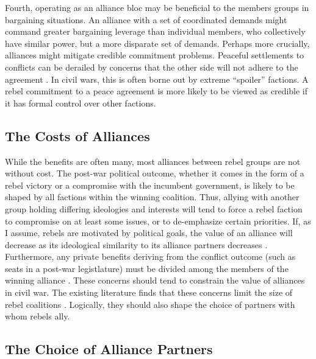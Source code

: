 \documentclass[12pt,]{book}
\begin{document}
Fourth, operating as an alliance bloc may be beneficial to the members
groups in bargaining situations. An alliance with a set of coordinated
demands might command greater bargaining leverage than individual
members, who collectively have similar power, but a more disparate set
of demands. Perhaps more crucially, alliances might mitigate credible
commitment problems. Peaceful settlements to conflicts can be derailed
by concerns that the other side will not adhere to the agreement
\citep{fearon95}. In civil wars, this is often borne out by extreme
``spoiler'' factions. A rebel commitment to a peace agreement is more
likely to be viewed as credible if it has formal control over other
factions.

\subsection{The Costs of Alliances}\label{the-costs-of-alliances}

While the benefits are often many, most alliances between rebel groups
are not without cost. The post-war political outcome, whether it comes
in the form of a rebel victory or a compromise with the incumbent
government, is likely to be shaped by all factions within the winning
coalition. Thus, allying with another group holding differing ideologies
and interests will tend to force a rebel faction to compromise on at
least some issues, or to de-emphasize certain priorities. If, as I
assume, rebels are motivated by political goals, the value of an
alliance will decrease as its ideological similarity to its alliance
partners decreases \citep{Bapat2012}. Furthermore, any private benefits
deriving from the conflict outcome (such as seats in a post-war
legistlature) must be divided among the members of the winning alliance
\citep{Christia2012}. These concerns should tend to constrain the value
of alliances in civil war. The existing literature finds that these
concerns limit the size of rebel coalitions \citep{Christia2012}.
Logically, they should also shape the choice of partners with whom
rebels ally.

\subsection{The Choice of Alliance
Partners}\label{the-choice-of-alliance-partners}
\end{document}
